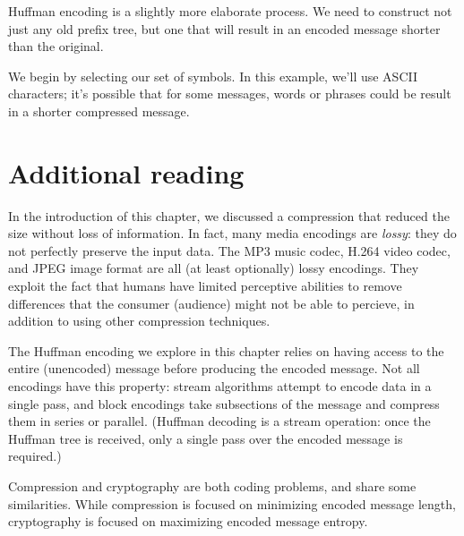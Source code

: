 Huffman encoding is a slightly more elaborate process. We need to construct not just any old prefix tree, but one that will result in an encoded message shorter than the original.

We begin by selecting our set of symbols. In this example, we'll use ASCII characters; it's possible that for some messages, words or phrases could be result in a shorter compressed message.


\section{Additional reading}

In the introduction of this chapter, we discussed a compression that reduced the size without loss of information. In fact, many media encodings are \textit{lossy}: they do not perfectly preserve the input data. The MP3 music codec, H.264 video codec, and JPEG image format are all (at least optionally) lossy encodings. They exploit the fact that humans have limited perceptive abilities to remove differences that the consumer (audience) might not be able to percieve, in addition to using other compression techniques.

The Huffman encoding we explore in this chapter relies on having access to the entire (unencoded) message before producing the encoded message. Not all encodings have this property: stream algorithms attempt to encode data in a single pass, and block encodings take subsections of the message and compress them in series or parallel. (Huffman decoding is a stream operation: once the Huffman tree is received, only a single pass over the encoded message is required.)

Compression and cryptography are both coding problems, and share some similarities. While compression is focused on minimizing encoded message length, cryptography is focused on maximizing encoded message entropy.
